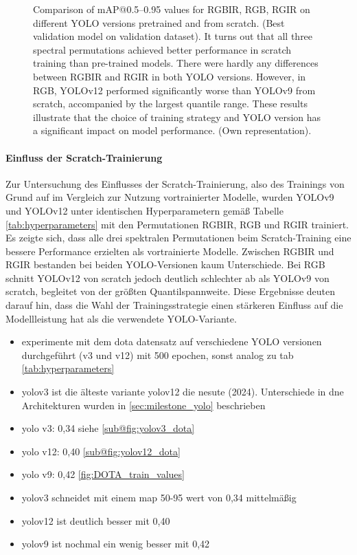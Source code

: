 \begin{figure}[htbp]
    \centering
    
    \caption[Comparison of \acrshort{mAP}@0.5--0.95 values for RGBIR, RGB, RGIR on different YOLO versions pretrained and from scratch (Best validation model on validation dataset)]{Comparison of \acrshort{mAP}@0.5--0.95 values for RGBIR, RGB, RGIR on different YOLO versions pretrained and from scratch. (Best validation model on validation dataset). It turns out that all three spectral permutations achieved better performance in scratch training than pre-trained models. There were hardly any differences between RGBIR and RGIR in both YOLO versions. However, in RGB, YOLOv12 performed significantly worse than YOLOv9 from scratch, accompanied by the largest quantile range. These results illustrate that the choice of training strategy and YOLO version has a significant impact on model performance.  (Own representation).}
    \label{fig:add_exp_map50-95:val_on_val}
\end{figure}


\paragraph{Einfluss der Scratch-Trainierung}
Zur Untersuchung des Einflusses der Scratch-Trainierung, also des Trainings von Grund auf im Vergleich zur Nutzung vortrainierter Modelle, wurden YOLOv9 und YOLOv12 unter identischen Hyperparametern gemäß Tabelle \ref{tab:hyperparameters} mit den Permutationen RGBIR, RGB und RGIR trainiert. Es zeigte sich, dass alle drei spektralen Permutationen beim Scratch-Training eine bessere Performance erzielten als vortrainierte Modelle. Zwischen RGBIR und RGIR bestanden bei beiden YOLO-Versionen kaum Unterschiede. Bei RGB schnitt YOLOv12 von scratch jedoch deutlich schlechter ab als YOLOv9 von scratch, begleitet von der größten Quantilspannweite. Diese Ergebnisse deuten darauf hin, dass die Wahl der Trainingsstrategie einen stärkeren Einfluss auf die Modellleistung hat als die verwendete YOLO-Variante.





\begin{itemize}
    \item experimente mit dem dota datensatz auf verschiedene YOLO versionen durchgeführt (v3 und v12) mit 500 epochen, sonst analog zu tab \ref{tab:hyperparameters}
    \item yolov3 ist die älteste variante yolov12 die nesute (2024). Unterschiede in dne Architekturen wurden in \ref{sec:milestone_yolo} beschrieben
    \item yolo v3: 0,34 siehe \ref{sub@fig:yolov3_dota}
    \item yolo v12: 0,40 \ref{sub@fig:yolov12_dota}
    \item yolo v9: 0,42 \ref{fig:DOTA_train_values}
    \item yolov3 schneidet mit einem map 50-95 wert von 0,34 mittelmäßig
    \item yolov12 ist deutlich besser mit 0,40
    \item yolov9 ist nochmal ein wenig besser mit 0,42
\end{itemize}

